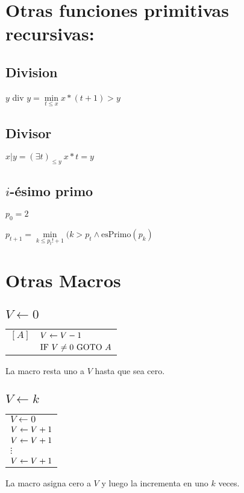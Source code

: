 \section{Otras funciones primitivas recursivas:}\label{appendix::funcpr}
\begin{multicols}{2}
\subsection{Division}
$y$ div $y = \min\limits_{t \leq x} x*(t+1) > y $

\subsection{Divisor}
$x | y = (\exists t)_{\leq y}~x*t = y $

\subsection{$i$-ésimo primo}
$p_0 = 2$

$p_{t+1} = \min\limits_{k \leq p_t!+1}(k > p_t \land \text{esPrimo}(p_k)$
\end{multicols}
\section{Otras Macros} \label{appendix::otrasMacros}
\setlength\columnsep{10pt}

\subsection{$V \leftarrow 0$}\label{appendix::otrasMAcros::resetVariable}
\begin{multicols}{2}
	\begin{center}
	\begin{tabular}{ll}
	$[A]$ & $V \leftarrow V - 1$ \\
	& $\text{IF }V \neq 0 \text{ GOTO } A$
\end{tabular}

	\end{center}
	
	\columnbreak
La macro resta uno a $V$ hasta que sea cero.
\end{multicols}

\subsection{$V \leftarrow k$}\label{appendix::otrasMAcros::asignarConstante}
\begin{multicols}{2}
	\begin{center}
	\begin{tabular}{l}
	$V \leftarrow 0$ \\
	$V \leftarrow V + 1$ \\
	$V \leftarrow V + 1$ \\
	$\vdots$ \\
	$V \leftarrow V + 1$ \\
\end{tabular}
	\end{center}
	
	\columnbreak
	La macro asigna cero a $V$ y luego la incrementa en uno $k$ veces.
\end{multicols}

